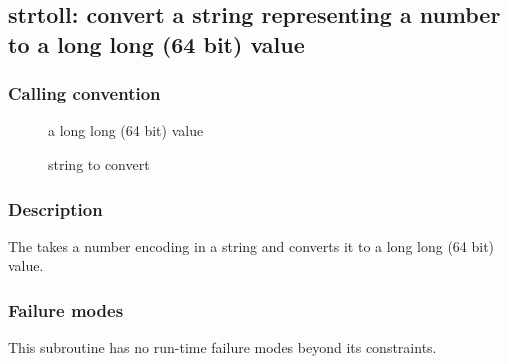 \clearpage
{}
{}
\label{subr:strtoll}
\subsection*{strtoll: convert a string representing a number to a
  long long (64 bit) value}

\subsubsection*{Calling convention}

\begin{description}
\item[] a long long (64 bit) value
\item[] string to convert
\end{description}

\subsubsection*{Description}

The  takes a number encoding in a string and
converts it to a long long (64 bit) value.

\subsubsection*{Failure modes}

This subroutine has no run-time failure modes beyond its constraints.
